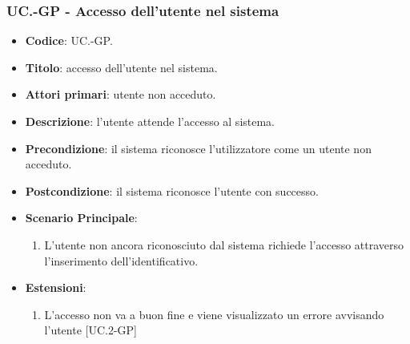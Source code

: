 	\subsubsection{UC\theuccount.\thesubuccount-GP - Accesso dell'utente nel sistema}
		\begin{itemize}
			\item \textbf{Codice}: UC\theuccount.\thesubuccount-GP.
			\item \textbf{Titolo}: accesso dell'utente nel sistema.
			\item \textbf{Attori primari}: utente non acceduto.
			\item \textbf{Descrizione}: l'utente attende l'accesso al sistema.
			\item \textbf{Precondizione}: il sistema riconosce l'utilizzatore come un utente non acceduto.
			\item \textbf{Postcondizione}: il sistema riconosce l'utente con successo.
			\item \textbf{Scenario Principale}:
			\begin{enumerate}
				\item L’utente non ancora riconosciuto dal sistema richiede l'accesso attraverso l'inserimento dell'identificativo.
			\end{enumerate}
			\item \textbf{Estensioni}:
			\begin{enumerate}
				\item L'accesso non va a buon fine e viene visualizzato un errore avvisando l'utente [UC\theuccount.2-GP]
			\end{enumerate}
		\end{itemize}
		
		\newpage
		
